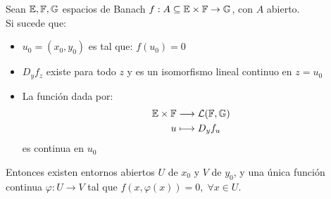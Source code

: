 \documentclass[12pt,a4paper]{book}
\begin{document}
\begin{teo}
Sean $\mathbb{E},\mathbb{F},\mathbb{G}$ espacios de Banach $f:A \subseteq \mathbb{E} \times \mathbb{F} \rightarrow \mathbb{G}$, con $A$ abierto. \\
Si sucede que:
\begin{itemize}
\item $u_0 = (x_0,y_0)$  es tal que: $f(u_0)=0$
\item $D_yf_z$ existe para todo $z$ y es un isomorfismo lineal continuo en $z=u_0$
\item La función dada por:
\begin{align*}
\mathbb{E} \times \mathbb{F} &\longrightarrow \mathcal{L}(\mathbb{F},\mathbb{G}) \\
u &\longmapsto D_yf_u
\end{align*}
es continua en $u_0$
\end{itemize}
Entonces existen entornos abiertos $U$ de $x_0$ y $V$ de $y_0$, y una única función continua $\varphi: U \rightarrow V$ tal que $f(x,\varphi(x))=0, \; \forall x \in U$. \\


\end{teo}
\end{document}
